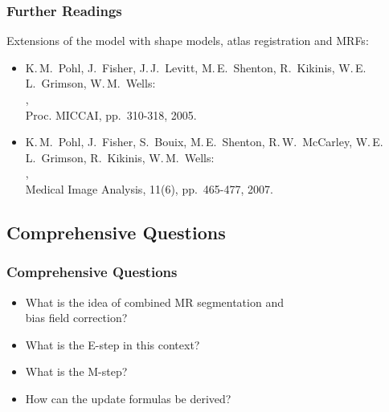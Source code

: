 \begin{frame}
  \frametitle{Further Readings \cont}

  Extensions of the model with shape models, atlas registration and MRFs: \\[.15cm]
  
  \begin{itemize}
    \item K.\,M.\ Pohl, J.\ Fisher, J.\,J.\ Levitt, M.\,E.\ Shenton, R.\ Kikinis, W.\,E.\,L.\ Grimson, W.\,M.\ Wells: \\
      , \\
      Proc. MICCAI, pp.\ 310-318, 2005. \\[.3cm]
    \item K.\,M.\ Pohl, J.\ Fisher, S.\ Bouix, M.\,E.\ Shenton, R.\,W.\ McCarley, W.\,E.\,L.\ Grimson, R.\ Kikinis, W.\,M.\ Wells: \\
      , \\
      Medical Image Analysis, 11(6), pp.\ 465-477, 2007.
  \end{itemize}
\end{frame}


\subsection{Comprehensive Questions}

\begin{frame}
  \frametitle{Comprehensive Questions}

  \begin{itemize}
    \item What is the idea of combined MR segmentation and \\ 
      bias field correction? \\[.5cm]
    \item What is the E-step in this context? \\[.5cm]
    \item What is the M-step? \\[.5cm]
    \item How can the update formulas be derived?
  \end{itemize}
\end{frame}
